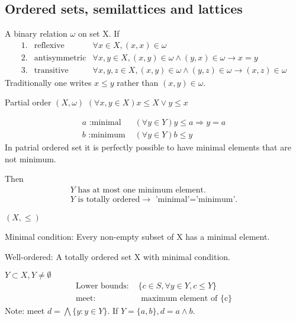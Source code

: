 \subsection[3]{Ordered sets, semilattices and lattices}

\begin{Def}A binary relation $\omega$ on set X. If 
    \begin{align*}
        1. & \text{reflexive} & \forall x \in X,(x,x) \in \omega   \\
        2. & \text{antisymmetric} & \forall x,y\in X,(x,y)\in \omega \wedge (y,x)\in \omega \rightarrow x=y    \\
        3. & \text{transitive} & \forall x,y,z \in X, (x,y)\in \omega \wedge (y,z)\in \omega \rightarrow (x,z)\in \omega
    \end{align*}
    Traditionally one writes $x\leq y$ rather than $(x,y)\in \omega$.
\end{Def}
\begin{Def} Partial order $(X,\omega)$
    $(\forall x,y\in X)x\leq X \vee y\leq x$   
\end{Def}

\begin{Def}
    \begin{align*}
        a\text{ :minimal } & (\forall y\in Y)y\leq a \Rightarrow y=a   \\
        b\text{ :minimum } & (\forall y \in Y)b\leq y
    \end{align*}
    In patrial ordered set it is perfectly possible to have minimal elements that are not minimum.
\end{Def}

\begin{Prop}Then
    \begin{align*}
        Y \text{ has at most one minimum element.}  \\
        Y \text{ is totally ordered} \rightarrow \text{ 'minimal'='minimum'.}
    \end{align*}
\end{Prop}

\begin{Def} $(X,\leq)$

    Minimal condition: Every non-empty subset of X has a minimal element.

    Well-ordered: A totally ordered set X with minimal condition.
\end{Def}
\begin{Def}$Y\subset X, Y\neq \emptyset$
    \begin{align*}
        \text{Lower bounds: } & \{c\in S, \forall y\in Y, c\leq Y\}\\
        \text{meet: }   & \text{ maximum element of {\{c\}}}
    \end{align*}
    Note: meet $d=\bigwedge \{y:y\in Y\}$. If $Y=\{a,b\}, d=a\wedge b$.
\end{Def}

